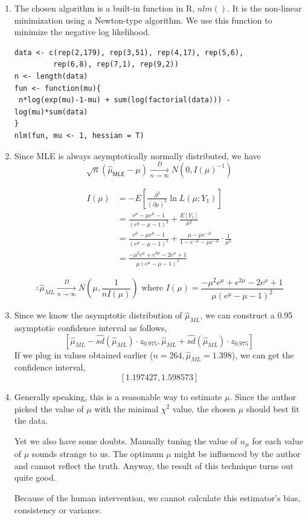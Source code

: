 \documentclass[11pt]{article}
\begin{document}
\begin{enumerate}
\item
The chosen algorithm is a built-in function in R, $nlm()$. It is the non-linear minimization using a Newton-type algorithm. We use this function to minimize the negative log likelihood.

\begin{lstlisting}[frame=single]
data <- c(rep(2,179), rep(3,51), rep(4,17), rep(5,6), 
         rep(6,8), rep(7,1), rep(9,2))
n <- length(data)
fun <- function(mu){
 n*log(exp(mu)-1-mu) + sum(log(factorial(data))) - log(mu)*sum(data) 
}
nlm(fun, mu <- 1, hessian = T)
\end{lstlisting}



\item Since MLE is always asymptotically normally distributed, we have 
$$\sqrt{n}\left( \hat{\mu}_{\mathsf{MLE}} -\mu \right)  \xrightarrow[n\rightarrow \infty]{D} 
N\left( 0,I(\mu)^{-1} \right)$$

\begin{equation*}
\begin{split}
I(\mu) &= -E[\frac{\partial^2}{(\partial \mu)^2} \ln L(\mu;Y_1)] \\
&=\frac{e^\mu-\mu e^\mu - 1}{(e^\mu-\mu-1)^2} + \frac{E[Y_1]}{\mu^2} \\
&=\frac{e^\mu-\mu e^\mu - 1}{(e^\mu-\mu-1)^2} + 
\frac{\mu-\mu e^{-\mu}}{1-e^{-\mu}-\mu e^{-\mu}} \cdot \frac{1}{\mu^2} \\
&= \frac{-\mu^2e^\mu + e^{2\mu} - 2e^\mu + 1}{\mu(e^\mu-\mu-1)^2}
\end{split}
\end{equation*}

$$\therefore \hat{\mu}_{ML} \xrightarrow[n\rightarrow\infty]{D} N\left( \mu, \frac{1}{nI(\mu)} \right)
\mbox{ where } I(\mu) = \frac{-\mu^2e^\mu + e^{2\mu} - 2e^\mu + 1}{\mu(e^\mu-\mu-1)^2}$$

\item
Since we know the asymptotic distribution of $\hat{\mu}_{ML}$, we can construct a 0.95 asymptotic confidence interval as follows,
$$\left[\hat{\mu}_{ML}-\widehat{sd}(\hat{\mu}_{ML}) \cdot z_{0.975},
\hat{\mu}_{ML}+\widehat{sd}(\hat{\mu}_{ML}) \cdot z_{0.975}   \right]$$
If we plug in values obtained earlier ($n=264, \hat{\mu}_{ML}=1.398$), we can get the confidence interval, 
$$[1.197427, 1.598573]$$

\item Generally speaking, this is a reasonable way to estimate $\mu$. Since the author picked the value of $\mu$ with the minimal $\chi^2$ value, the chosen $\mu$ should best fit the data. \par
Yet we also have some doubts. Manually tuning the value of $n_\mu$ for each value of $\mu$ sounds strange to us. The optimum $\mu$ might be influenced by the author and cannot reflect the truth. Anyway, the result of this technique turns out quite good. \par
Because of the human intervention, we cannot calculate this estimator's bias, consistency or variance.


\end{enumerate}
\end{document}
